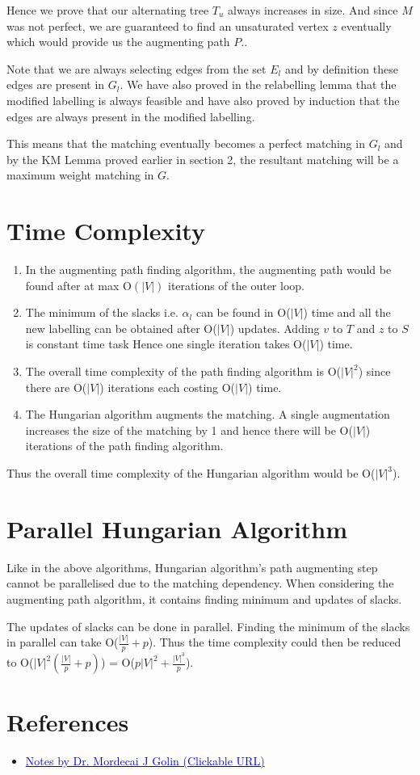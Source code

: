 \documentclass{article}
\begin{document}
Hence we prove that our alternating tree $T_u$ always increases in size. And since $M$ was not perfect, we are guaranteed to find an unsaturated vertex $z$ eventually which would provide us the augmenting path $P$..

Note that we are always selecting edges from the set $E_l$ and by definition these edges are present in $G_l$. We have also proved in the relabelling lemma that the modified labelling is always feasible and have also proved by induction that the edges are always present in the modified labelling. 

This means that the matching eventually becomes a perfect matching in $G_l$ and by the KM Lemma proved earlier in section 2, the resultant matching will be a maximum weight matching in $G$.

\section{Time Complexity}
\begin{enumerate}
    \item In the augmenting path finding algorithm, the augmenting path would be found after at max O$(|V|)$ iterations of the outer loop.
    \item The minimum of the slacks i.e. $\alpha_l$ can be found in O($|V|$) time and all the new labelling can be obtained after O($|V|$) updates. Adding $v$ to $T$ and $z$ to $S$ is constant time task Hence one single iteration takes O($|V|$) time.
    \item The overall time complexity of the path finding algorithm is O($|V|^2$) since there are O($|V|$) iterations each costing O($|V|$) time.
    \item The Hungarian algorithm augments the matching. A single augmentation increases the size of the matching by 1 and hence there will be O($|V|$) iterations of the path finding algorithm.
\end{enumerate}
Thus the overall time complexity of the Hungarian algorithm would be O($|V|^3$).

\section{Parallel Hungarian Algorithm}
Like in the above algorithms, Hungarian algorithm's path augmenting step cannot be parallelised due to the matching dependency. When considering the augmenting path algorithm, it contains finding minimum and updates of slacks.

The updates of slacks can be done in parallel. Finding the minimum of the slacks in parallel can take O($\frac{|V|}{p}+p$). Thus the time complexity could then be reduced to O($|V|^2(\frac{|V|}{p}+p)$) = O($p|V|^2 + \frac{|V|^3}{p}$).

\section{References}

\begin{itemize}
    \item \href{http://www.cse.ust.hk/~golin/COMP572/Notes/Matching.pdf}{\textcolor{blue}{Notes by Dr. Mordecai J Golin (Clickable URL)}}
\end{itemize}
\end{document}
